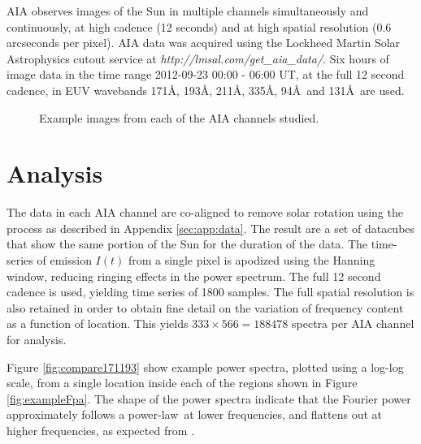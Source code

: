 \documentclass[onecolumn]{emulateapj}
\newcommand{\PS}{power spectrum}
\newcommand{\PL}{power-law}
\newcommand{\allaiaeuv}{171\AA, 193\AA, 211\AA, 335\AA, 94\AA\ and 131\AA}
\newcommand{\BF}{ }
\begin{document}
{\BF AIA} observes images of the Sun in multiple channels
simultaneously and continuously, at high cadence (12 seconds) and at
high spatial resolution (0.6 arcseconds per pixel).  {\BF AIA} data
was acquired using the Lockheed Martin Solar Astrophysics cutout
service at {\it http://lmsal.com/get\_aia\_data/}.  Six hours of image
data in the time range 2012-09-23 00:00 - 06:00 UT, at the full 12
second cadence, in EUV wavebands \allaiaeuv\ are used.  
\begin{figure}
\centerline{
}
\centerline{
}
\centerline{
}
\caption{Example images from each of the AIA channels studied.}
\label{fig:allimages}
\end{figure}

\section{Analysis}\label{sec:anal}
The data in each AIA channel are co-aligned to remove solar rotation
using the process as described in Appendix \ref{sec:app:data}.  The
result are a set of datacubes that show the same portion of the Sun
for the duration of the data.  The time-series of emission $I(t)$ from
a single pixel is apodized using the Hanning window, reducing ringing
effects in the \PS.  The full 12 second cadence is used, yielding time
series of 1800 samples.  The full spatial resolution is also retained
in order to obtain fine detail on the variation of frequency content
as a function of location.  This yields $333\times566=188478$ spectra
per AIA channel for analysis.

Figure \ref{fig:compare171193} show example power spectra, plotted
using a log-log scale, from a single location inside each of the
regions shown in Figure \ref{fig:exampleFpa}.  The shape of the power
spectra indicate that the Fourier power approximately follows a
\PL\ at lower frequencies, and flattens out at higher frequencies, as
expected from \citet{ireland2015}. 
\end{document}
